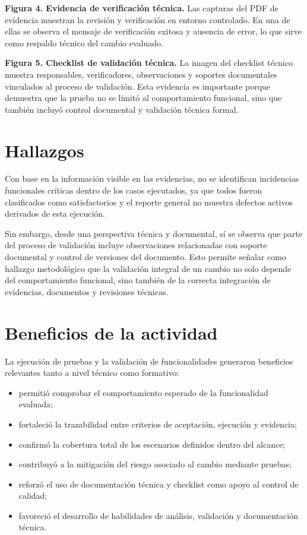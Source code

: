 \documentclass[12pt]{article}
\begin{document}
\textbf{Figura 4. Evidencia de verificación técnica.} Las capturas del PDF de evidencia muestran la revisión y verificación en entorno controlado. En una de ellas se observa el mensaje de verificación exitosa y ausencia de error, lo que sirve como respaldo técnico del cambio evaluado.

\textbf{Figura 5. Checklist de validación técnica.} La imagen del checklist técnico muestra responsables, verificadores, observaciones y soportes documentales vinculados al proceso de validación. Esta evidencia es importante porque demuestra que la prueba no se limitó al comportamiento funcional, sino que también incluyó control documental y validación técnica formal.

\section*{Hallazgos}

Con base en la información visible en las evidencias, no se identifican incidencias funcionales críticas dentro de los casos ejecutados, ya que todos fueron clasificados como satisfactorios y el reporte general no muestra defectos activos derivados de esta ejecución.

Sin embargo, desde una perspectiva técnica y documental, sí se observa que parte del proceso de validación incluye observaciones relacionadas con soporte documental y control de versiones del documento. Esto permite señalar como hallazgo metodológico que la validación integral de un cambio no solo depende del comportamiento funcional, sino también de la correcta integración de evidencias, documentos y revisiones técnicas.

\section*{Beneficios de la actividad}

La ejecución de pruebas y la validación de funcionalidades generaron beneficios relevantes tanto a nivel técnico como formativo:

\begin{itemize}
    \item permitió comprobar el comportamiento esperado de la funcionalidad evaluada;
    \item fortaleció la trazabilidad entre criterios de aceptación, ejecución y evidencia;
    \item confirmó la cobertura total de los escenarios definidos dentro del alcance;
    \item contribuyó a la mitigación del riesgo asociado al cambio mediante pruebas;
    \item reforzó el uso de documentación técnica y checklist como apoyo al control de calidad;
    \item favoreció el desarrollo de habilidades de análisis, validación y documentación técnica.
\end{itemize}
\end{document}
